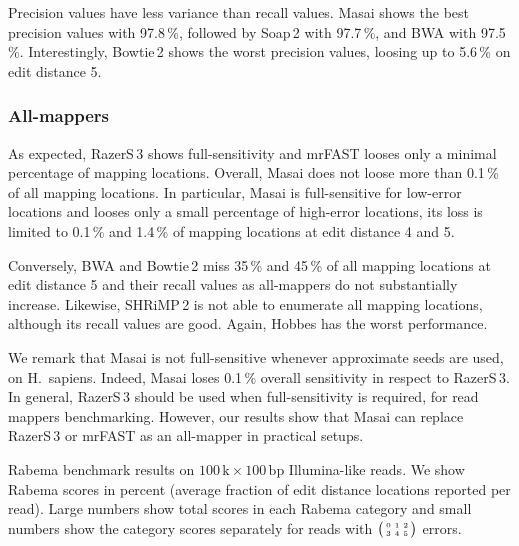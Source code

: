 Precision values have less variance than recall values. Masai shows the best precision values with 97.8\,\%, followed by Soap\,2 with 97.7\,\%, and BWA with 97.5\,\%. Interestingly, Bowtie\,2 shows the worst precision values, loosing up to 5.6\,\% on edit distance 5.

\subsubsection{All-mappers}
As expected, RazerS\,3 shows full-sensitivity and mrFAST looses only a minimal percentage of mapping locations.
Overall, Masai does not loose more than 0.1\,\% of all mapping locations.
In particular, Masai is full-sensitive for low-error locations and looses only a small percentage of high-error locations, \ie its loss is limited to 0.1\,\% and 1.4\,\% of mapping locations at edit distance 4 and 5.

Conversely, BWA and Bowtie\,2 miss 35\,\% and 45\,\% of all mapping locations at edit distance 5 and their recall values as all-mappers do not substantially increase.
Likewise, SHRiMP\,2 is not able to enumerate all mapping locations, although its recall values are good.
Again, Hobbes has the worst performance.

We remark that Masai is not full-sensitive whenever approximate seeds are used, \eg on H.~sapiens. Indeed, Masai loses 0.1\,\% overall sensitivity in respect to RazerS\,3.
In general, RazerS\,3 should be used when full-sensitivity is required, \ie for read mappers benchmarking. However, our results show that Masai can replace RazerS\,3 or mrFAST as an all-mapper in practical setups.

\begin{table*}[t]
  \caption[Masai results in the Rabema benchmark]
  {
  \label{tab:Rabema}
    Rabema benchmark results on $100\,\text{k}\times 100\,\text{bp}$ Illumina-like reads.
    We show Rabema scores in percent (average fraction of edit distance locations reported per read).
    Large numbers show total scores in each Rabema category and small numbers show the category scores separately for reads with $\bigl(\begin{smallmatrix}\mbox{\tiny 0}&\mbox{\tiny 1}&\mbox{\tiny 2}\\\mbox{\tiny 3}&\mbox{\tiny 4}&\mbox{\tiny 5}\end{smallmatrix}\bigr)$ errors.
    }
  \vspace{-3mm}
  \center
  \sffamily
  \resizebox{0.95\textwidth}{!}
  {
	\renewcommand{\tabcolsep}{0.8ex}
	
  }
\end{table*}


